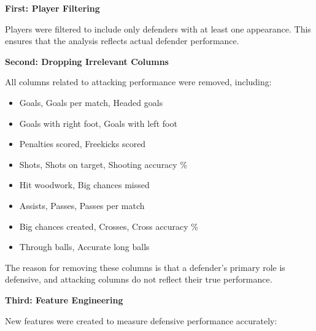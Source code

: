 \documentclass[12pt,a4paper]{article}
\begin{document}
\textbf{First: Player Filtering}

Players were filtered to include only defenders with at least one appearance. This ensures that the analysis reflects actual defender performance.

\textbf{Second: Dropping Irrelevant Columns}

All columns related to attacking performance were removed, including:
\begin{itemize}
    \item Goals, Goals per match, Headed goals
    \item Goals with right foot, Goals with left foot
    \item Penalties scored, Freekicks scored
    \item Shots, Shots on target, Shooting accuracy \%
    \item Hit woodwork, Big chances missed
    \item Assists, Passes, Passes per match
    \item Big chances created, Crosses, Cross accuracy \%
    \item Through balls, Accurate long balls
\end{itemize}

The reason for removing these columns is that a defender's primary role is defensive, and attacking columns do not reflect their true performance.

\textbf{Third: Feature Engineering}

New features were created to measure defensive performance accurately:
\end{document}
